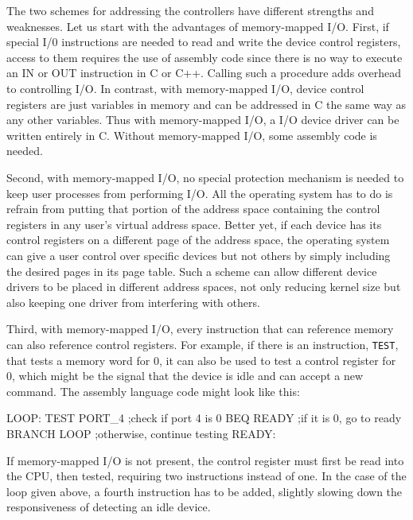 The two schemes for addressing the controllers have different strengths and
weaknesses. Let us start with the advantages of memory-mapped I/O. First, if special I/0
instructions are needed to read and write the device control registers, access to them
requires the use of assembly code since there is no way to execute an IN or OUT
instruction in C or C++. Calling such a procedure adds overhead to controlling I/O. In
contrast, with memory-mapped I/O, device control registers are just variables in memory
and can be addressed in C the same way as any other variables. Thus with memory-mapped
I/O, a I/O device driver can be written entirely in C. Without memory-mapped I/O, some
assembly code is needed.

Second, with memory-mapped I/O, no special protection mechanism is needed to keep user
processes from performing I/O. All the operating system has to do is refrain from putting
that portion of the address space containing the control registers in any user's virtual
address space. Better yet, if each device has its control registers on a different page of
the address space, the operating system can give a user control over specific devices but
not others by simply including the desired pages in its page table. Such a scheme can
allow different device drivers to be placed in different address spaces, not only reducing
kernel size but also keeping one driver from interfering with others.

Third, with memory-mapped I/O, every instruction that can reference memory can also
reference control registers. For example, if there is an instruction, \texttt{TEST}, that
tests a memory word for 0, it can also be used to test a control register for 0, which
might be the signal that the device is idle and can accept a new command.  The assembly
language code might look like this:

\begin{nasmcode}
        LOOP: TEST   PORT_4  ;check if port 4 is 0
              BEQ    READY   ;if it is 0, go to ready
              BRANCH LOOP    ;otherwise, continue testing
        READY:    
\end{nasmcode}

If memory-mapped I/O is not present, the control register must first be read into
the CPU, then tested, requiring two instructions instead of one. In the case of the
loop given above, a fourth instruction has to be added, slightly slowing down the
responsiveness of detecting an idle device.

